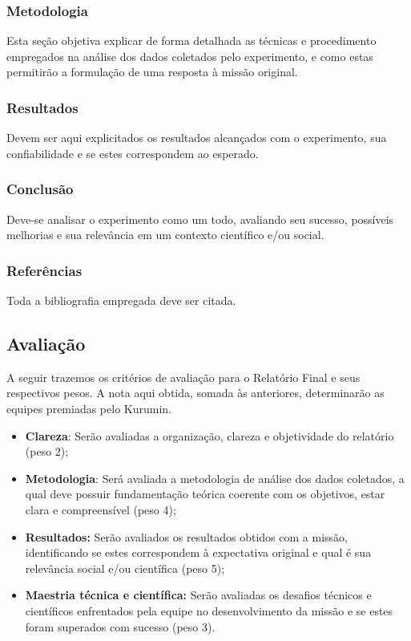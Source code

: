         \subsubsection{Metodologia}
            Esta seção objetiva explicar de forma detalhada as técnicas e procedimento empregados na análise dos dados coletados pelo experimento, e como estas permitirão a formulação de uma resposta à missão original.

        \subsubsection{Resultados}
            Devem ser aqui explicitados os resultados alcançados com o experimento, sua confiabilidade e se estes correspondem ao esperado.

        \subsubsection{Conclusão}
            Deve-se analisar o experimento como um todo, avaliando seu sucesso, possíveis melhorias e sua relevância em um contexto científico e/ou social.

        \subsubsection{Referências}
            Toda a bibliografia empregada deve ser citada.

     \subsection{Avaliação}
        A seguir trazemos os critérios de avaliação para o Relatório Final e seus respectivos pesos. A nota aqui obtida, somada às anteriores, determinarão as equipes premiadas pelo Kurumin.
        
        \begin{itemize}
            \item \textbf{Clareza}: Serão avaliadas a organização, clareza e objetividade do relatório (peso 2);
            
            \item \textbf{Metodologia}: Será avaliada a metodologia de análise dos dados coletados, a qual deve possuir fundamentação teórica coerente com os objetivos, estar clara e compreensível (peso 4);

            \item \textbf{Resultados:} Serão avaliados os resultados obtidos com a missão, identificando se estes correspondem à expectativa original e qual é sua relevância social e/ou científica (peso 5);

            \item \textbf{Maestria técnica e científica:} Serão avaliadas os desafios técnicos e científicos enfrentados pela equipe no desenvolvimento da missão e se estes foram superados com sucesso (peso 3).
        \end{itemize}
        
